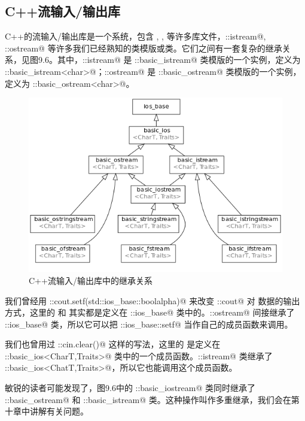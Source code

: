 \subsection*{C++流输入/输出库}
C++的流输入/输出库是一个系统，包含 \lstinline@iostream@, \lstinline@fstream@, \lstinline@sstream@ 等许多库文件，\lstinline@std::istream@, \lstinline@std::ostream@ 等许多我们已经熟知的类模版或类。它们之间有一套复杂的继承关系，见图9.6。其中，\lstinline@std::istream@ 是 \lstinline@std::basic_istream@ 类模版的一个实例，定义为 \lstinline@std::basic_istream<char>@；\lstinline@std::ostream@ 是 \lstinline@std::basic_ostream@ 类模版的一个实例，定义为 \lstinline@std::basic_ostream<char>@。\par
\begin{figure}[htbp]
    \centering
    \includegraphics[width=.8\textwidth]{../images/generalized_parts/09_inheritance_diagram_of_io_library.png}
    \caption{C++流输入/输出库中的继承关系}
\end{figure}
我们曾经用 \lstinline@std::cout.setf(std::ios_base::boolalpha)@ 来改变 \lstinline@std::cout@ 对 \lstinline@bool@ 数据的输出方式，这里的 \lstinline@setf@ 和 \lstinline@fmtflags@ 其实都是定义在 \lstinline@std::ios_base@ 类中的。\lstinline@std::ostream@ 间接继承了 \lstinline@std::ios_base@ 类，所以它可以把 \lstinline@std::ios_base::setf@ 当作自己的成员函数来调用。\par
我们也曾用过 \lstinline@std::cin.clear()@ 这样的写法，这里的 \lstinline@clear@ 是定义在 \lstinline@std::basic_ios<CharT,Traits>@ 类中的一个成员函数。\lstinline@std::istream@ 类继承了 \lstinline@std::basic_ios<ChatT,Traits>@，所以它也能调用这个成员函数。\par
敏锐的读者可能发现了，图9.6中的 \lstinline@std::basic_iostream@ 类同时继承了 \lstinline@std::basic_ostream@ 和 \lstinline@std::basic_istream@ 类。这种操作叫作多重继承，我们会在第十章中讲解有关问题。\par
